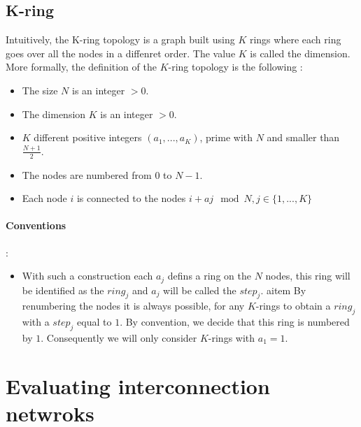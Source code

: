 \documentclass[11pt,a4paper]{report}
\begin{document}
\subsection{K-ring} %
\label{sub:K-ring}

Intuitively, the K-ring topology is a graph built using $K$ rings where each ring goes over all the nodes in a diffenret order. The value $K$ is called the dimension. More formally, the definition of the $K$-ring topology is the following :
\begin{itemize}
    \item The size $N$ is an integer $>0$.
    \item The dimension $K$ is an integer $>0$.
    \item $K$ different positive integers $(a_1,...,a_K)$, prime with $N$ and smaller than $\frac{N+1}{2}$.
    \item The nodes are numbered from $0$ to $N-1$.
    \item Each node $i$ is connected to the nodes $i+aj \mod N, j \in \{1,...,K\}$
\end{itemize}

\paragraph*{Conventions} :
\begin{itemize}
    \item With such a construction each $a_j$ defins a ring on the $N$ nodes, this ring will be identified as the $ring_j$ and $a_j$ will be called the $step_j$.
    aitem By renumbering the nodes it is always possible, for any $K$-rings to obtain a $ring_j$ with a $step_j$ equal to $1$. By convention, we decide that this ring is numbered by $1$. Consequently we will only consider $K$-rings with $a_1=1$.
\end{itemize}



\section{Evaluating interconnection netwroks} %
\label{sec:Evaluating interconnection netwroks}
\end{document}

